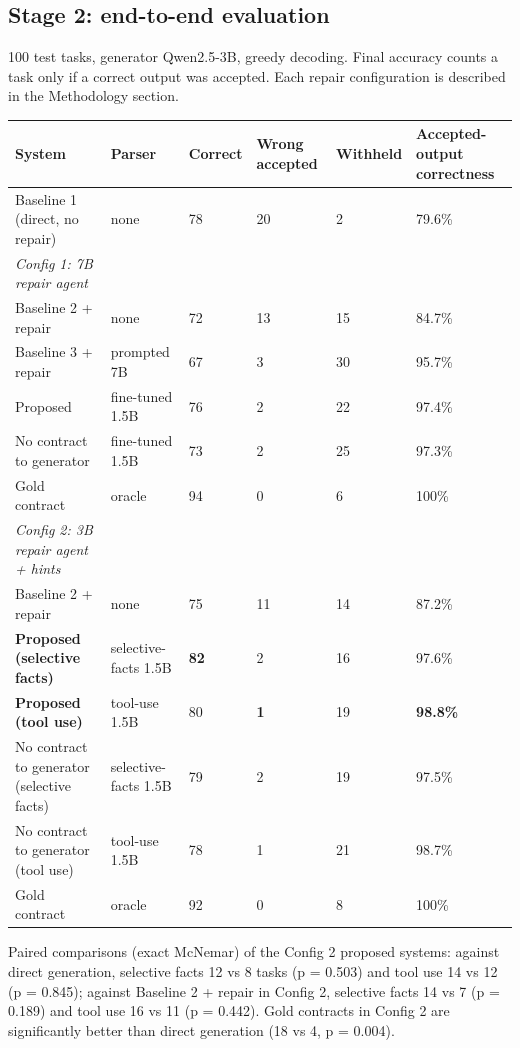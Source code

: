 \documentclass[11pt]{article}
\begin{document}
\subsection{Stage 2: end-to-end evaluation}

100 test tasks, generator Qwen2.5-3B, greedy decoding. Final accuracy
counts a task only if a correct output was accepted. Each repair
configuration is described in the Methodology section.

\begin{table}[!tp]
\centering\footnotesize\setlength{\tabcolsep}{3pt}\renewcommand{\arraystretch}{1.1}
\begin{tabularx}{\textwidth}{>{\raggedright\arraybackslash}Xlllll}
\toprule
\textbf{System} & \textbf{Parser} & \textbf{Correct} & \textbf{Wrong accepted} & \textbf{Withheld} & \textbf{Accepted-output correctness} \\
\midrule
Baseline 1 (direct, no repair) & none & 78 & 20 & 2 & 79.6\% \\
\emph{Config 1: 7B repair agent} &  &  &  &  &  \\
Baseline 2 + repair & none & 72 & 13 & 15 & 84.7\% \\
Baseline 3 + repair & prompted 7B & 67 & 3 & 30 & 95.7\% \\
Proposed & fine-tuned 1.5B & 76 & 2 & 22 & 97.4\% \\
No contract to generator & fine-tuned 1.5B & 73 & 2 & 25 & 97.3\% \\
Gold contract & oracle & 94 & 0 & 6 & 100\% \\
\emph{Config 2: 3B repair agent + hints} &  &  &  &  &  \\
Baseline 2 + repair & none & 75 & 11 & 14 & 87.2\% \\
\textbf{Proposed (selective facts)} & selective-facts 1.5B & \textbf{82} & 2 & 16 & 97.6\% \\
\textbf{Proposed (tool use)} & tool-use 1.5B & 80 & \textbf{1} & 19 & \textbf{98.8\%} \\
No contract to generator (selective facts) & selective-facts 1.5B & 79 & 2 & 19 & 97.5\% \\
No contract to generator (tool use) & tool-use 1.5B & 78 & 1 & 21 & 98.7\% \\
Gold contract & oracle & 92 & 0 & 8 & 100\% \\
\bottomrule
\end{tabularx}
\end{table}

Paired comparisons (exact McNemar) of the Config 2 proposed systems:
against direct generation, selective facts 12 vs 8 tasks (p = 0.503) and
tool use 14 vs 12 (p = 0.845); against Baseline 2 + repair in Config 2,
selective facts 14 vs 7 (p = 0.189) and tool use 16 vs 11 (p = 0.442).
Gold contracts in Config 2 are significantly better than direct
generation (18 vs 4, p = 0.004).
\end{document}

